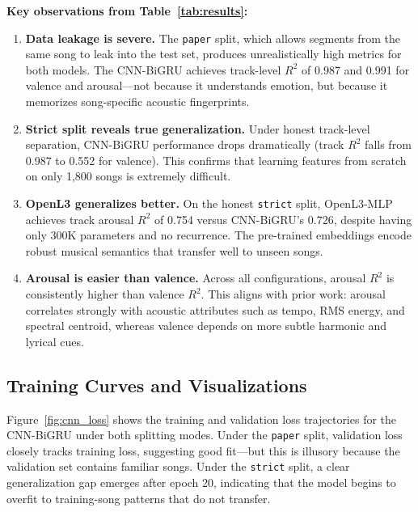 \documentclass[12pt,a4paper]{article}
\begin{document}
\textbf{Key observations from Table~\ref{tab:results}:}

\begin{enumerate}
    \item \textbf{Data leakage is severe.} The \texttt{paper} split, which allows segments from the same song to leak into the test set, produces unrealistically high metrics for both models. The CNN-BiGRU achieves track-level $R^2$ of 0.987 and 0.991 for valence and arousal---not because it understands emotion, but because it memorizes song-specific acoustic fingerprints.
    
    \item \textbf{Strict split reveals true generalization.} Under honest track-level separation, CNN-BiGRU performance drops dramatically (track $R^2$ falls from 0.987 to 0.552 for valence). This confirms that learning features from scratch on only 1,800 songs is extremely difficult.
    
    \item \textbf{OpenL3 generalizes better.} On the honest \texttt{strict} split, OpenL3-MLP achieves track arousal $R^2$ of 0.754 versus CNN-BiGRU's 0.726, despite having only 300K parameters and no recurrence. The pre-trained embeddings encode robust musical semantics that transfer well to unseen songs.
    
    \item \textbf{Arousal is easier than valence.} Across all configurations, arousal $R^2$ is consistently higher than valence $R^2$. This aligns with prior work: arousal correlates strongly with acoustic attributes such as tempo, RMS energy, and spectral centroid, whereas valence depends on more subtle harmonic and lyrical cues.
\end{enumerate}

\subsection{Training Curves and Visualizations}

Figure~\ref{fig:cnn_loss} shows the training and validation loss trajectories for the CNN-BiGRU under both splitting modes. Under the \texttt{paper} split, validation loss closely tracks training loss, suggesting good fit---but this is illusory because the validation set contains familiar songs. Under the \texttt{strict} split, a clear generalization gap emerges after epoch 20, indicating that the model begins to overfit to training-song patterns that do not transfer.
\end{document}
